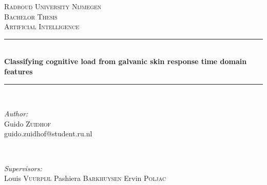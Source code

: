 \documentclass[12pt,leqno,letterpaper]{report} %
\begin{document}
\begin{titlepage}

\newcommand{\HRule}{\rule{\linewidth}{0.5mm}} %

\center %
 

\textsc{\LARGE Radboud University Nijmegen}\\[1.5cm] %
\textsc{\Large Bachelor Thesis}\\[0.5cm] %
\textsc{\large Artificial Intelligence}\\[0.5cm] %


\HRule \\[0.4cm]
{ \huge \bfseries Classifying cognitive load from galvanic skin response time domain features}\\[0.4cm] %
\HRule \\[1.5cm]
 

\begin{minipage}{0.4\textwidth}
\begin{flushleft} \large
\emph{Author:}\\
Guido \textsc{Zuidhof} %
\\\small{guido.zuidhof@student.ru.nl}
\end{flushleft}
\end{minipage}
~
\begin{minipage}{0.4\textwidth}
\begin{flushright} \large
\emph{Supervisors:} \\
Louis \textsc{Vuurpijl} %
Pashiera \textsc{Barkhuysen}
Ervin \textsc{Poljac}
\end{flushright}
\end{minipage}\\[4cm]


\end{titlepage}
\end{document}
